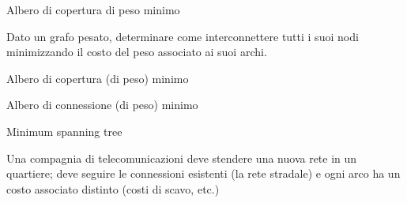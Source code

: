 \begin{frame}{Albero di copertura di peso minimo}

\vspace{-9pt}
\begin{myboxtitle}[Problema]
Dato un grafo pesato, determinare come interconnettere tutti i suoi nodi
minimizzando il costo del peso associato ai suoi archi.
\BI
\item \alert{Albero di copertura (di peso) minimo}
\item \alert{Albero di connessione (di peso) minimo}
\item \alert	{Minimum spanning tree}
\EI
\end{myboxtitle}

\begin{myboxtitle}
Una compagnia di telecomunicazioni deve stendere una nuova rete
in un quartiere; deve seguire le connessioni esistenti (la rete stradale)
e ogni arco ha un costo associato distinto (costi di scavo, etc.)
\end{myboxtitle}
\end{frame}

